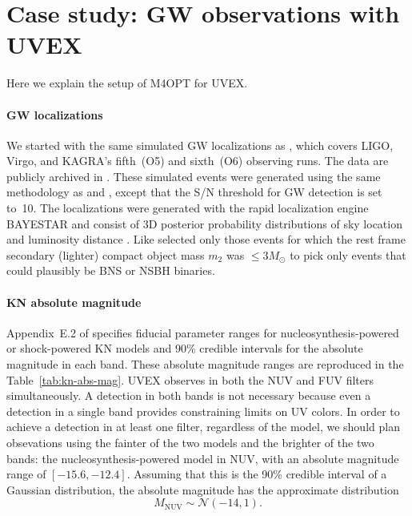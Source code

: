 \documentclass[twocolumn,times]{aastex631}
\begin{document}
\section{Case study: GW observations with UVEX}

Here we explain the setup of \ac{M4OPT} for \ac{UVEX}.

\paragraph{\Ac{GW} localizations}
We started with the same simulated \ac{GW} localizations as \citet{criswell}, which covers LIGO, Virgo, and KAGRA's fifth~(O5) and sixth~(O6) observing runs. The data are publicly archived in \cite{r_weizmann_2025_14585837}. These simulated events were generated using the same methodology as \citet{2022ApJ...924...54P} and \citet{2023ApJ...958..158K}, except that the \ac{S/N} threshold for \ac{GW} detection is set to~10. The localizations were generated with the rapid localization engine BAYESTAR \citep{2016PhRvD..93b4013S} and consist of 3D posterior probability distributions of sky location and luminosity distance \citep{2016ApJ...829L..15S,2016ApJS..226...10S}. Like \citet{criswell} selected only those events for which the rest frame secondary (lighter) compact object mass $m_2$ was $\leq 3 M_\odot$ to pick only events that could plausibly be \ac{BNS} or \ac{NSBH} binaries.

\paragraph{\Ac{KN} absolute magnitude}
Appendix~E.2 of \citet{2021arXiv211115608K} specifies fiducial parameter ranges for nucleosynthesis-powered or shock-powered \ac{KN} models and 90\% credible intervals for the absolute magnitude in each band. These absolute magnitude ranges are reproduced in the Table~\ref{tab:kn-abs-mag}. \ac{UVEX} observes in both the \ac{NUV} and \ac{FUV} filters simultaneously. A detection in both bands is not necessary because even a detection in a single band provides constraining limits on \ac{UV} colors. In order to achieve a detection in at least one filter, regardless of the model, we should plan obsevations using the fainter of the two models and the brighter of the two bands: the nucleosynthesis-powered model in NUV, with an absolute magnitude range of $[-15.6, -12.4]$. Assuming that this is the 90\% credible interval of a Gaussian distribution, the absolute magnitude has the approximate distribution
%
\begin{equation}
    \label{eq:absmag-distn}
    M_\mathrm{NUV} \sim \mathcal{N}(-14, 1).
\end{equation}
\end{document}
